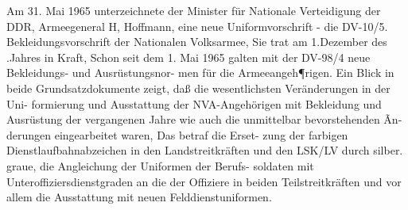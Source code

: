 

Am 31. Mai 1965 unterzeichnete der Minister für
Nationale Verteidigung der DDR, Armeegeneral
H, Hoffmann, eine neue Uniformvorschrift - die
DV-10/5. Bekleidungsvorschrift der Nationalen
Volksarmee, Sie trat am 1.Dezember des .Jahres in
Kraft, Schon seit dem 1. Mai 1965 galten mit der
DV-98/4 neue Bekleidungs- und Ausrüstungsnor-
men für die Armeeangeh¶rigen.
Ein Blick in beide Grundsatzdokumente zeigt,
daß die wesentlichsten Veränderungen in der Uni-
formierung und Ausstattung der NVA-Angehörigen
mit Bekleidung und Ausrüstung der vergangenen
Jahre wie auch die unmittelbar bevorstehenden Ãn-
derungen eingearbeitet waren, Das betraf die Erset-
zung der farbigen Dienstlaufbahnabzeichen in den
Landstreitkräften und den LSK/LV durch silber.
graue, die Angleichung der Uniformen der Berufs-
soldaten mit Unteroffiziersdienstgraden an die der
Offiziere in beiden Teilstreitkräften und vor allem
die Ausstattung mit neuen Felddienstuniformen.